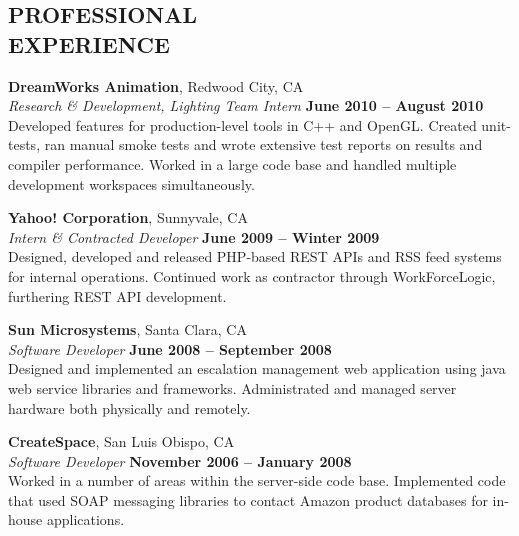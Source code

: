 \documentclass[margin,line]{resume}
\begin{document}
\begin{resume}
\sectionline

    \section{\mysidestyle \textbf{\large{P}\small{ROFESSIONAL\\EXPERIENCE}}}

    \textbf{\listing DreamWorks Animation}, Redwood City, CA \vspace{2mm}\\\vspace{1mm}%
    \textsl{Research \& Development, Lighting Team Intern} \hfill \textbf{June 2010 -- August 2010}\\
    Developed features for production-level tools in C++ and OpenGL.
    Created unit-tests, ran manual smoke tests and wrote extensive test reports on results and compiler performance.
    Worked in a large code base and handled multiple development workspaces simultaneously.

    \textbf{\listing Yahoo! Corporation}, Sunnyvale, CA \vspace{2mm}\\\vspace{1mm}%
    \textsl{Intern \& Contracted Developer} \hfill \textbf{June 2009 -- Winter 2009}\\
    Designed, developed and released PHP-based REST APIs and RSS feed systems for internal operations.
    Continued work as contractor through WorkForceLogic, furthering REST API development.

    \textbf{\listing Sun Microsystems}, Santa Clara, CA \vspace{2mm}\\\vspace{1mm}%
    \textsl{Software Developer} \hfill \textbf{June 2008 -- September 2008}\\
    Designed and implemented an escalation management web application using java web service libraries and frameworks.
    Administrated and managed server hardware both physically and remotely.

    \textbf{\listing CreateSpace}, San Luis Obispo, CA \vspace{2mm}\\\vspace{1mm}%
    \textsl{Software Developer} \hfill \textbf{November 2006 -- January 2008}\\
    Worked in a number of areas within the server-side code base.
    Implemented code that used SOAP messaging libraries to contact Amazon product databases for in-house applications.
    


\end{resume}
\end{document}
